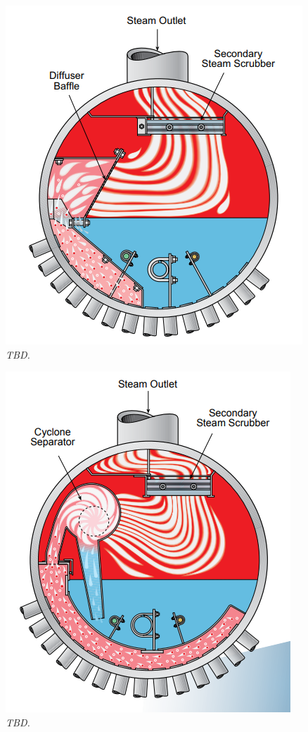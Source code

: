 \begin{figure}[ht]
    \centerline{\includegraphics[scale=0.6]{drum_internals_01.png}}
    \caption{\textit{TBD.}}
    \label{im:drum_internals_01}
\end{figure}

\begin{figure}[ht]
    \centerline{\includegraphics[scale=0.6]{drum_internals_02.png}}
    \caption{\textit{TBD.}}
    \label{im:drum_internals_02}
\end{figure}

